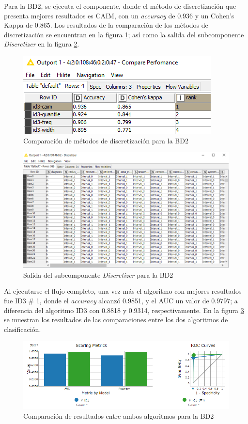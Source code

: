 Para la BD2, se ejecuta el componente, donde el método de discretización que presenta mejores resultados es CAIM, con un \textit{accuracy} de 0.936 y un Cohen's Kappa de 0.865. Los resultados de la comparación de los métodos de discretización se encuentran en la figura \ref{fig:bd-cancerdata-ranking}; así como la salida del subcomponente \textit{Discretizer} en la figura \ref{fig:bd-cancerdata-salida-disc}.

\begin{figure}[H]
	\centering
	\includegraphics[width=0.7\linewidth]{"figuras/capi 3/pruebas-jenn/bd-cancer_data-ranking"}
	\caption{Comparación de métodos de discretización para la BD2}
	\label{fig:bd-cancerdata-ranking}
\end{figure}

\begin{figure}[H]
	\centering
	\includegraphics[width=0.7\linewidth]{"figuras/capi 3/pruebas-jenn/bd-cancer_data-salida-disc"}
	\caption{Salida del subcomponente \textit{Discretizer} para la BD2}
	\label{fig:bd-cancerdata-salida-disc}
\end{figure}

Al ejecutarse el flujo completo, una vez más el algoritmo con mejores resultados fue ID3 \# 1, donde el \textit{accuracy} alcanzó 0.9851, y el AUC un valor de 0.9797; a diferencia del algoritmo ID3 con 0.8818 y 0.9314, respectivamente. En la figura \ref{fig:bd-cancerdata-graficos} se muestran los resultados de las comparaciones entre los dos algoritmos de clasificación.

\begin{figure}[H]
	\centering
	\includegraphics[width=0.7\linewidth]{"figuras/capi 3/pruebas-jenn/bd-cancer_data-graficos"}
	\caption{Comparación de resultados entre ambos algoritmos para la BD2}
	\label{fig:bd-cancerdata-graficos}
\end{figure}

